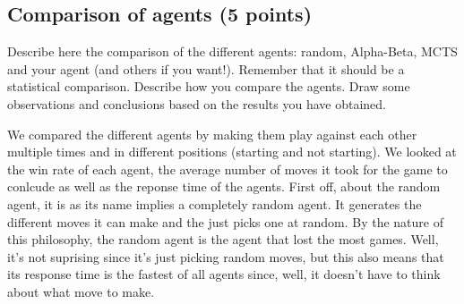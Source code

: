 \documentclass[11pt,a4paper]{report}
\begin{document}
\newpage
\subsection{Comparison of agents (5 points)}
Describe here the comparison of the different agents: random, Alpha-Beta, MCTS and your agent (and others if you want!). Remember that it should be a statistical comparison. Describe how you compare the agents. Draw some observations and conclusions based on the results you have obtained.

\begin{answers}[20cm]
    We compared the different agents by making them play against each other multiple times and in different positions (starting and not starting).
    We looked at the win rate of each agent, the average number of moves it took for the game to conlcude as well as the reponse time of the agents.
    First off, about the random agent, it is as its name implies a completely random agent. It generates the different moves it can make
    and the just picks one at random. By the nature of this philosophy, the random agent is the agent that lost the most games. Well, it's not 
    suprising since it's just picking random moves, but this also means that its response time is the fastest of all agents since, well, 
    it doesn't have to think about what move to make.


\end{answers}
\end{document}
